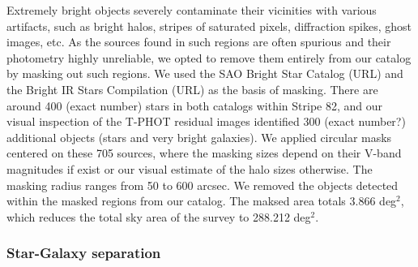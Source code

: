 \documentclass[apj,iop]{emulateapj}
\begin{document}
Extremely bright objects severely contaminate their vicinities with various artifacts, such as bright halos, stripes of saturated pixels, diffraction spikes, ghost images, etc. As the sources found in such regions are often spurious and their photometry highly unreliable, we opted to remove them entirely from our catalog by masking out such regions. We used the SAO Bright Star Catalog (URL) and the Bright IR Stars Compilation (URL) as the basis of masking. There are around 400 (exact number) stars in both catalogs within Stripe 82, and our visual inspection of the T-PHOT residual images identified 300 (exact number?) additional objects (stars and very bright galaxies). We applied circular masks centered on these 705 sources, where the masking sizes depend on their V-band magnitudes if exist or our visual estimate of the halo sizes otherwise.  The masking radius ranges from 50 to 600 arcsec. We removed the objects detected within the masked regions from our catalog. The maksed area totals 3.866 deg$^2$, which reduces the total sky area of the survey to 288.212 deg$^2$.


\subsubsection{Star-Galaxy separation}

\end{document}

